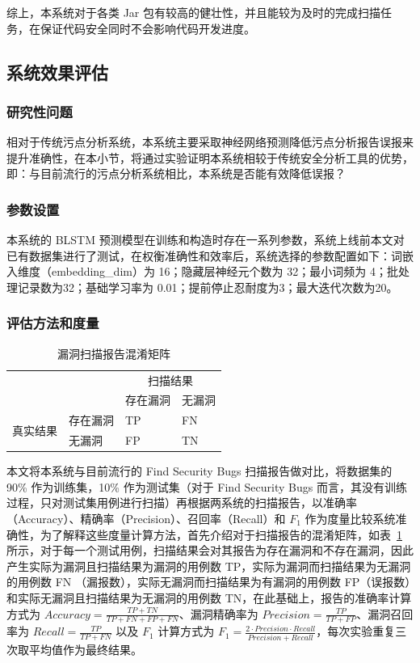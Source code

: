 综上，本系统对于各类 Jar 包有较高的健壮性，并且能较为及时的完成扫描任务，在保证代码安全同时不会影响代码开发进度。

\subsection{系统效果评估}

\subsubsection{研究性问题}
相对于传统污点分析系统，本系统主要采取神经网络预测降低污点分析报告误报来提升准确性，在本小节，将通过实验证明本系统相较于传统安全分析工具的优势，即：与目前流行的污点分析系统相比，本系统是否能有效降低误报？

\subsubsection{参数设置}
本系统的 BLSTM 预测模型在训练和构造时存在一系列参数，系统上线前本文对已有数据集进行了测试，在权衡准确性和效率后，系统选择的参数配置如下：词嵌入维度（embedding\_dim）为 16；隐藏层神经元个数为 32；最小词频为 4；批处理记录数为32；基础学习率为 0.01；提前停止忍耐度为3；最大迭代次数为20。

\subsubsection{评估方法和度量}
\begin{table}[htbp]\footnotesize
    \centering
    \caption{漏洞扫描报告混淆矩阵}
    \begin{tabular}{clll}
        \toprule
        \multicolumn{2}{c}{\multirow{2}[4]{*}{}} & \multicolumn{2}{c}{扫描结果} \\
        \cmidrule{3-4}    \multicolumn{2}{c}{} & 存在漏洞  & 无漏洞 \\
        \midrule
        \multirow{2}[2]{*}{真实结果} & 存在漏洞  & TP    & FN \\
        & 无漏洞   & FP    & TN \\
        \bottomrule
    \end{tabular}%
    \label{tab:confusionMatrix}%
\end{table}

本文将本系统与目前流行的 Find Security Bugs 扫描报告做对比，将数据集的 90\% 作为训练集，10\% 作为测试集（对于 Find Security Bugs 而言，其没有训练过程，只对测试集用例进行扫描）再根据两系统的扫描报告，以准确率（Accuracy）、精确率（Precision）、召回率（Recall）和 $F_{1}$ 作为度量比较系统准确性，为了解释这些度量计算方法，首先介绍对于扫描报告的混淆矩阵，如表~\ref{tab:confusionMatrix} 所示，对于每一个测试用例，扫描结果会对其报告为存在漏洞和不存在漏洞，因此产生实际为漏洞且扫描结果为漏洞的用例数 TP，实际为漏洞而扫描结果为无漏洞的用例数 FN （漏报数），实际无漏洞而扫描结果为有漏洞的用例数 FP（误报数）和实际无漏洞且扫描结果为无漏洞的用例数 TN，在此基础上，报告的准确率计算方式为 $Accuracy=\frac{TP+TN}{TP+FN+FP+FN}$、漏洞精确率为 $Precision=\frac{TP}{TP+FP}$、漏洞召回率为 $Recall=\frac{TP}{TP+FN}$ 以及 $F_1$ 计算方式为 $F_{1}=\frac{2 \cdot Precision \cdot Recall}{Precision+Recall}$，每次实验重复三次取平均值作为最终结果。

